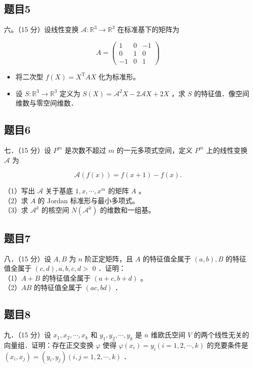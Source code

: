 \documentclass{article}
\begin{document}
\subsection{题目5}
六。（15 分）设线性变换 \(\mathcal{A}: \mathbb{R}^{3} \rightarrow \mathbb{R}^{3}\) 在标准基下的矩阵为

\[
A=\left(\begin{array}{ccc}
1 & 0 & -1 \\
0 & 1 & 0 \\
-1 & 0 & 1
\end{array}\right)
\]

\begin{itemize}
  \item[（1）] 将二次型 \(f(X)=X^{\mathrm{T}} A X\) 化为标准形。
  \item[（2）] 设 \(S: \mathbb{R}^{3} \rightarrow \mathbb{R}^{3}\) 定义为 \(S(X)=\mathcal{A}^{2} X-2 \mathcal{A} X+2 X\) ，求 \(S\) 的特征值．像空间维数与零空间维数．
\end{itemize}

\subsection{题目6}
七．（15 分）设 \(P^{m}\) 是次数不超过 \(m\) 的一元多项式空间，定义 \(P^{m}\) 上的线性变换 \(\mathcal{A}\) 为

\[
\mathcal{A}(f(x))=f(x+1)-f(x) .
\]

（1）写出 \(\mathcal{A}\) 关于基底 \(1, x, \cdots, x^{m}\) 的矩阵 \(A\) 。\\
（2）求 \(A\) 的 Jordan 标准形与最小多项式。\\
（3）求 \(\mathcal{A}^{k}\) 的核空间 \(N\left(\mathcal{A}^{k}\right)\) 的维数和一组基。

\subsection{题目7}
八．（15 分）设 \(A, B\) 为 \(n\) 阶正定矩阵，且 \(A\) 的特征值全属于 \((a, b), B\) 的特征值全属于 \((c, d), a, b, c, d>\) 0 ．证明：\\
（1）\(A+B\) 的特征值全属于 \((a+c, b+d)\) 。\\
（2）\(A B\) 的特征值全属于 \((a c, b d)\) ．

\subsection{题目8}
九．（15 分）设 \(x_{1}, x_{2}, \cdots, x_{k}\) 和 \(y_{1}, y_{2}, \cdots, y_{k}\) 是 \(n\) 维欧氏空间 \(V\) 的两个线性无关的向量组．证明：存在正交变换 \(\varphi\) 使得 \(\varphi\left(x_{i}\right)=y_{i}(i=1,2, \cdots, k)\) 的充要条件是 \(\left(x_{i}, x_{j}\right)=\left(y_{i}, y_{j}\right)(i, j=1,2, \cdots, k)\) ．
\end{document}
